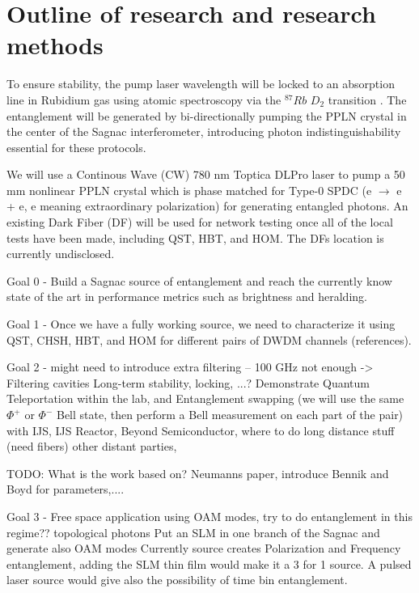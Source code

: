 \documentclass{article}
\theoremstyle{mytheoremstyle}
\theoremstyle{mytheoremstyle}
\theoremstyle{myproblemstyle}
\begin{document}
\newpage
\section{Outline of research and research methods}

To ensure stability, the pump laser wavelength will be locked to an absorption line in Rubidium gas using atomic spectroscopy via the $^{87}Rb$ $D_2$ transition \cite{metger2017sas}.
The entanglement will be generated by bi-directionally pumping the PPLN crystal in the center of the Sagnac interferometer,
introducing photon indistinguishability essential for these protocols.

We will use a Continous Wave (CW) 780 nm Toptica DLPro laser to pump a 50 mm nonlinear PPLN crystal which is phase matched for Type-0 SPDC (e $\rightarrow$ e + e, e meaning extraordinary polarization)
for generating entangled photons.
An existing Dark Fiber (DF) will be used for network testing once all of the local tests have been made, including QST, HBT, and HOM.
The DFs location is currently undisclosed.

Goal 0 - Build a Sagnac source of entanglement and reach the currently know state of the art in performance metrics such as brightness and heralding.

Goal 1 - Once we have a fully working source, we need to characterize it using QST, CHSH, HBT, and HOM for different pairs of DWDM channels (references).

Goal 2 - might need to introduce extra filtering -- 100 GHz not enough -> Filtering cavities
Long-term stability, locking, ...? Demonstrate Quantum Teleportation within the lab, and Entanglement swapping (we will use the same $\Phi^+$ or $\Phi^-$ Bell state,
then perform a Bell measurement on each part of the pair) with IJS, IJS Reactor, Beyond Semiconductor, where to do
long distance stuff (need fibers) other distant parties,

TODO: What is the work based on? Neumanns paper, introduce Bennik and Boyd for parameters,....

Goal 3 - Free space application using OAM modes, try to do entanglement in this regime?? topological photons
Put an SLM in one branch of the Sagnac and generate also OAM modes
Currently source creates Polarization and Frequency entanglement, adding the SLM thin film would make it a 3 for 1 source. A pulsed laser source would give 
also the possibility of time bin entanglement.
\end{document}
